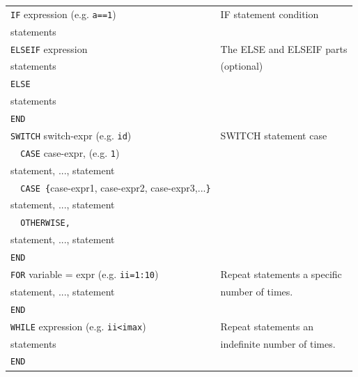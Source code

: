 \begin{tabular}{ll}\hline
\verb(IF( expression (e.g. \verb/a==1/)& IF statement condition\\
  \hspace*{0.3cm} statements\\
\verb(ELSEIF( expression & The ELSE and ELSEIF parts\\
  \hspace*{0.3cm} statements &  (optional)\\
\verb(ELSE(\\
  \hspace*{0.3cm} statements\\
\verb(END(\\
\hline
\verb(SWITCH( switch-expr (e.g. \verb/id/)& SWITCH statement case \\
\verb(  CASE( case-expr, (e.g. \verb/1/) \\
  \hspace*{0.6cm} statement, ..., statement\\
\verb(  CASE {(case-expr1, case-expr2, case-expr3,...\verb(}(\\
  \hspace*{0.6cm} statement, ..., statement\\
\verb(  OTHERWISE,(\\
  \hspace*{0.6cm} statement, ..., statement\\
\verb(END(\\
\hline
\verb(FOR( variable = expr (e.g. \verb/ii=1:10/)& Repeat statements a specific\\
  \hspace*{0.3cm} statement, ..., statement & number of times.\\
\verb(END(\\
\hline
\verb(WHILE( expression (e.g. \verb/ii<imax/)& Repeat statements an \\
  \hspace*{0.3cm} statements & indefinite number of times.\\
\verb(END(\\
\hline
\end{tabular}

\vspace*{-0.2cm}
$\phantom{x}$

